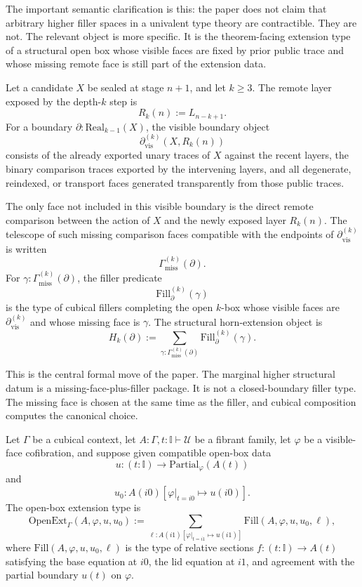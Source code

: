 \documentclass{lmcs}
\begin{document}
The important semantic clarification is this: the paper does not claim that arbitrary higher
filler spaces in a univalent type theory are contractible.  They are not.  The relevant object
is more specific.  It is the theorem-facing extension type of a structural open box whose
visible faces are fixed by prior public trace and whose missing remote face is still part of
the extension data.

\begin{defi}
\label{def:structural-horn-package}
Let a candidate \(X\) be sealed at stage \(n+1\), and let \(k\geq 3\).  The remote layer
exposed by the depth-\(k\) step is
\[
  R_k(n) := L_{n-k+1}.
\]
For a boundary \(\partial : \mathrm{Real}_{k-1}(X)\), the visible boundary object
\[
  \partial_{\mathrm{vis}}^{(k)}(X,R_k(n))
\]
consists of the already exported unary traces of \(X\) against the recent layers, the binary
comparison traces exported by the intervening layers, and all degenerate, reindexed, or
transport faces generated transparently from those public traces.

The only face not included in this visible boundary is the direct remote comparison between
the action of \(X\) and the newly exposed layer \(R_k(n)\).  The telescope of such missing
comparison faces compatible with the endpoints of \(\partial_{\mathrm{vis}}^{(k)}\) is written
\[
  \Gamma_{\mathrm{miss}}^{(k)}(\partial).
\]
For \(\gamma:\Gamma_{\mathrm{miss}}^{(k)}(\partial)\), the filler predicate
\[
  \mathrm{Fill}^{(k)}_{\partial}(\gamma)
\]
is the type of cubical fillers completing the open \(k\)-box whose visible faces are
\(\partial_{\mathrm{vis}}^{(k)}\) and whose missing face is \(\gamma\).  The structural
horn-extension object is
\[
  H_k(\partial)
  :=
  \sum_{\gamma:\Gamma_{\mathrm{miss}}^{(k)}(\partial)}
  \mathrm{Fill}^{(k)}_{\partial}(\gamma).
\]
\end{defi}

This is the central formal move of the paper.  The marginal higher structural datum is a
missing-face-plus-filler package.  It is not a closed-boundary filler type.  The missing face is
chosen at the same time as the filler, and cubical composition computes the canonical choice.

\begin{defi}
\label{def:open-ext}
Let \(\Gamma\) be a cubical context, let \(A : \Gamma,t:\mathbb I\vdash \mathcal U\) be a
fibrant family, let \(\varphi\) be a visible-face cofibration, and suppose given compatible
open-box data
\[
  u : (t:\mathbb I) \to \mathrm{Partial}_{\varphi}(A(t))
\]
and
\[
  u_0 : A(i0)[\varphi|_{t=i0}\mapsto u(i0)].
\]
The open-box extension type is
\[
  \mathrm{OpenExt}_{\Gamma}(A,\varphi,u,u_0)
  :=
  \sum_{\ell:A(i1)[\varphi|_{t=i1}\mapsto u(i1)]}
  \mathrm{Fill}(A,\varphi,u,u_0,\ell),
\]
where \(\mathrm{Fill}(A,\varphi,u,u_0,\ell)\) is the type of relative sections
\(f:(t:\mathbb I)\to A(t)\) satisfying the base equation at \(i0\), the lid equation at
\(i1\), and agreement with the partial boundary \(u(t)\) on \(\varphi\).
\end{defi}
\end{document}
